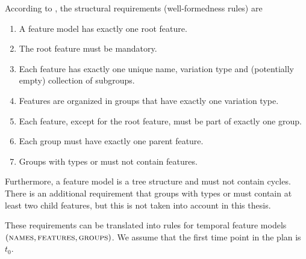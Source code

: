 According to \cite{art:consistency-preserving-evolution-planning}, the structural requirements (well-formedness rules) are 
\begin{enumerate}[\itbf{WF\arabic*}, itemsep=0mm]
   \item A feature model has exactly one root feature.
   \item The root feature must be mandatory.
   \item Each feature has exactly one unique name, variation type and (potentially empty) collection of subgroups.
   \item Features are organized in groups that have exactly one variation type.
   \item Each feature, except for the root feature, must be part of exactly one group.
   \item Each group must have exactly one parent feature.
   \item Groups with types \xortype{} or \ortype{} must not contain \mandatory{} features.
\end{enumerate}

Furthermore, a feature model is a tree structure and must not contain cycles. There is an additional requirement that groups with types \xortype{} or \ortype{} must contain at least two child features, but this is not taken into account in this thesis.

These requirements can be translated into rules for temporal feature models $(\textsc{names}, \textsc{features}, \textsc{groups}{})$. We assume that the first time point in the plan is $t_0$.

